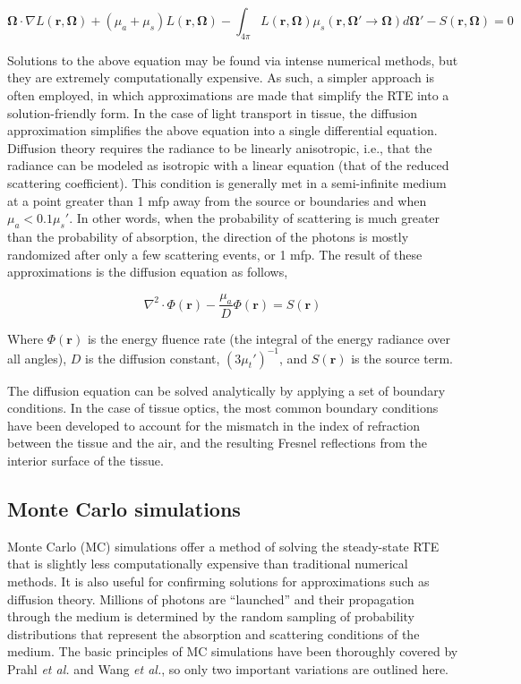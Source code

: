 \begin{equation}
\label{eq:rte}
\mathbf{\Omega}\cdot\nabla L(\mathbf{r},\mathbf{\Omega}) + (\mu_a + \mu_s) L(\mathbf{r},\mathbf{\Omega}) - \int_{4\pi} L(\mathbf{r},\mathbf{\Omega}) \mu_s(\mathbf{r},\mathbf{\Omega}' \rightarrow \mathbf{\Omega}) d \mathbf{\Omega'} - S(\mathbf{r},\mathbf{\Omega}) = 0
\end{equation}

Solutions to the above equation may be found via intense numerical methods, but they are extremely computationally expensive. As such, a simpler approach is often employed, in which approximations are made that simplify the RTE into a solution-friendly form. In the case of light transport in tissue, the diffusion approximation simplifies the above equation into a single differential equation.
Diffusion theory requires the radiance to be linearly anisotropic, i.e., that the radiance can be modeled as isotropic with a linear equation (that of the reduced scattering coefficient). This condition is generally met in a semi-infinite medium at a point greater than 1 mfp away from the source or boundaries\cite{Jacques2004} and when $ \mu_a < 0.1\mu_s'$.\cite{Wilson2008} In other words, when the probability of scattering is much greater than the probability of absorption, the direction of the photons is mostly randomized after only a few scattering events, or 1 mfp. The result of these approximations is the diffusion equation as follows,

\begin{equation}
\label{eq:diffeq}
\nabla^2 \cdot \Phi(\mathbf{r}) - \frac{\mu_a}{D}\Phi(\mathbf{r}) = S(\mathbf{r})
\end{equation}

Where $\Phi(\mathbf{r})$ is the energy fluence rate (the integral of the energy radiance over all angles), $D$ is the diffusion constant, $(3\mu_t')^{-1}$, and $S(\mathbf{r})$ is the source term.

The diffusion equation can be solved analytically by applying a set of boundary conditions. In the case of tissue optics, the most common boundary conditions have been developed to account for the mismatch in the index of refraction between the tissue and the air, and the resulting Fresnel reflections from the interior surface of the tissue.

\subsection{Monte Carlo simulations}
\label{sec:mc}
Monte Carlo (MC) simulations offer a method of solving the steady-state RTE that is slightly less computationally expensive than traditional numerical methods. It is also useful for confirming solutions for approximations such as diffusion theory. Millions of photons are ``launched'' and their propagation through the medium is determined by the random sampling of probability distributions that represent the absorption and scattering conditions of the medium. The basic principles of MC simulations have been thoroughly covered by Prahl \emph{et al.}\cite{Prahl1989} and Wang \emph{et al.},\cite{Wang1995} so only two important variations are outlined here.

